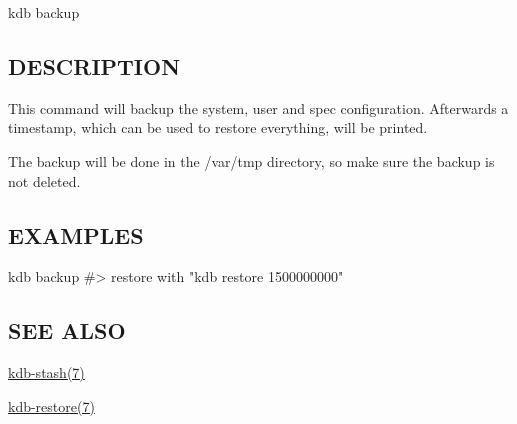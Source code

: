 {\ttfamily kdb backup}

\subsection*{D\+E\+S\+C\+R\+I\+P\+T\+I\+ON}

This command will backup the {\ttfamily system}, {\ttfamily user} and {\ttfamily spec} configuration. Afterwards a timestamp, which can be used to restore everything, will be printed.

The backup will be done in the {\ttfamily /var/tmp} directory, so make sure the backup is not deleted.

\subsection*{E\+X\+A\+M\+P\+L\+ES}


\begin{DoxyCode}
kdb backup
#> restore with "kdb restore 1500000000"
\end{DoxyCode}


\subsection*{S\+EE A\+L\+SO}


\begin{DoxyItemize}
\item \hyperlink{md_doc_help_kdb-stash_doc_help_kdb-stash_md}{kdb-\/stash(7)}
\item \hyperlink{md_doc_help_kdb-restore_doc_help_kdb-restore_md}{kdb-\/restore(7)} 
\end{DoxyItemize}